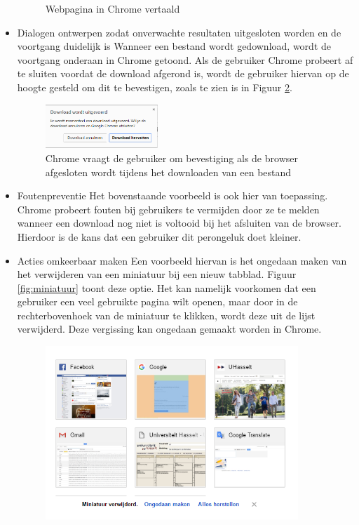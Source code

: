 \documentclass[12pt]{article}
\begin{document}
\begin{itemize}
\begin{figure}
		\caption{Webpagina in Chrome vertaald}
		\label{fig:vertaal}
	\end{figure}
	\item Dialogen ontwerpen zodat onverwachte resultaten uitgesloten worden en de voortgang duidelijk is
	\newline
	Wanneer een bestand wordt gedownload, wordt de voortgang onderaan in Chrome getoond. Als de gebruiker Chrome probeert af te sluiten voordat de download afgerond is, wordt de gebruiker hiervan op de hoogte gesteld om dit te bevestigen, zoals te zien is in Figuur \ref{fig:download}.
	\begin{figure}
		\centering
		\includegraphics[width=0.4\textwidth]{imgDownload.png}
		\caption{Chrome vraagt de gebruiker om bevestiging als de browser afgesloten wordt tijdens het downloaden van een bestand}
		\label{fig:download}
	\end{figure}
	\item Foutenpreventie
	\newline
	Het bovenstaande voorbeeld is ook hier van toepassing. Chrome probeert fouten bij gebruikers te vermijden door ze te melden wanneer een download nog niet is voltooid bij het afsluiten van de browser. Hierdoor is de kans dat een gebruiker dit perongeluk doet kleiner.
	\item Acties omkeerbaar maken
	\newline
	Een voorbeeld hiervan is het ongedaan maken van het verwijderen van een miniatuur bij een nieuw tabblad. Figuur \ref{fig:miniatuur} toont deze optie. Het kan namelijk voorkomen dat een gebruiker een veel gebruikte pagina wilt openen, maar door in de rechterbovenhoek van de miniatuur te klikken, wordt deze uit de lijst verwijderd. Deze vergissing kan ongedaan gemaakt worden in Chrome.
	\begin{figure}
		\centering
		\includegraphics[width=0.9\textwidth]{imgMiniatuur.png}

\end{figure}
\end{itemize}
\end{document}
